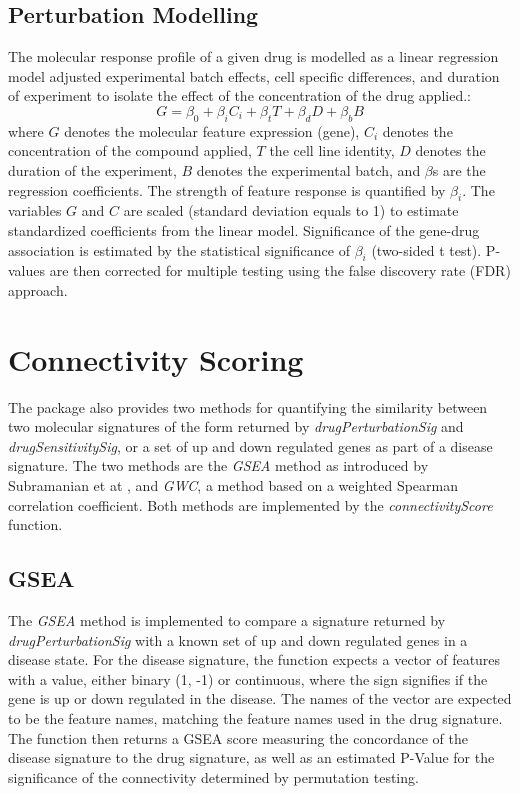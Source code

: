 \documentclass[11pt]{article}
\begin{document}
\subsection{Perturbation Modelling}
The molecular response profile of a given drug is modelled as a linear regression model adjusted experimental batch effects, cell specific differences, and duration of experiment to isolate the effect of the concentration of the drug applied.: 
$$G = \beta_{0} + \beta_{i}C_i + \beta_{t}T + \beta_{d}D + \beta_{b}B$$
where $G$ denotes the molecular feature expression (gene), $C_i$ denotes the concentration of the compound applied, $T$ the cell line identity, $D$ denotes the duration of the experiment,  $B$ denotes the experimental batch, and $\beta$s are the regression coefficients. The strength of feature response is quantified by $\beta_i$. %
The variables $G$ and $C$ are scaled (standard deviation equals to 1) to estimate standardized coefficients from the linear model. Significance of the gene-drug association is estimated by the statistical significance of $\beta_i$ (two-sided t test). P-values are then corrected for multiple testing using the false discovery rate (FDR) approach.


\section{Connectivity Scoring}
The package also provides two methods for quantifying the similarity between two molecular signatures of the form returned by \textit{drugPerturbationSig} and \textit{drugSensitivitySig}, or a set of up and down regulated genes as part of a disease signature. 
The two methods are the \textit{GSEA} method as introduced by Subramanian et at \cite{subramanian_gene_2005}, and \textit{GWC}, a method based on a weighted Spearman correlation coefficient. Both methods are implemented by the \textit{connectivityScore} function.

\subsection{GSEA}

The \textit{GSEA} method is implemented to compare a signature returned by \textit{drugPerturbationSig} with a known set of up and down regulated genes in a disease state. For the disease signature, the function expects a vector of features with a value, either binary (1, -1) or continuous, where the sign signifies if the gene is up or down regulated in the disease. The names of the vector are expected to be the feature names, matching the feature names used in the drug signature. The function then returns a GSEA score measuring the concordance of the disease signature to the drug signature, as well as an estimated P-Value for the significance of the connectivity determined by permutation testing. 
\end{document}
